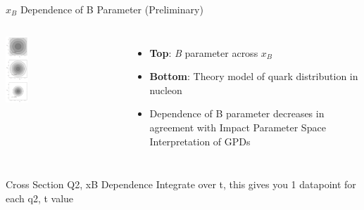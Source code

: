 \documentclass[aspectratio=169]{beamer}
\newcommand*{\myfont}{\fontfamily{lmtt}\selectfont}
\begin{document}
\begin{frame}{$x_B$ Dependence of B Parameter (Preliminary)}
\begin{columns}
                        \includegraphics[trim={0 0cm 0 17cm},clip,width=0.2\textwidth]{lastminute/xbB.png}\\
                    {\myfont{\tiny [M. Burkardt arXiv 0207047] }}

               \centering
                    \begin{itemize}
                        \item \textbf{Top}: \textit{B} parameter across $x_B$
                        \item \textbf{Bottom}: Theory model of quark distribution in nucleon
                        \item Dependence of B parameter decreases in agreement with Impact Parameter Space Interpretation of GPDs
                    \end{itemize}
                

                                
                

    \end{columns}
\end{frame}

\iffalse
\begin{frame}{Cross Section Q2, xB Dependence}
Integrate over t, this gives you 1 datapoint for each q2, t value
\end{frame}
\end{document}
